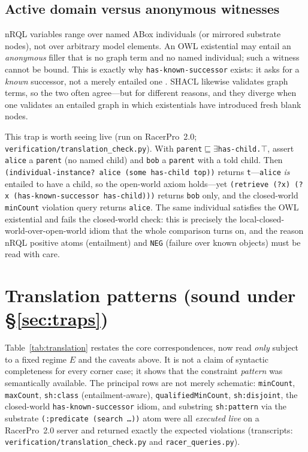 \documentclass[11pt,letterpaper]{article}
\theoremstyle{definition}
\newcommand{\nrql}{nRQL}
\newcommand{\racer}{RacerPro}
\newcommand{\shacl}{SHACL}
\newcommand{\abox}{ABox}
\newcommand{\owl}{OWL}
\begin{document}
\subsection{Active domain versus anonymous witnesses}
\nrql{} variables range over named \abox{} individuals (or mirrored substrate nodes), not over arbitrary model elements. An \owl{} existential may entail an \emph{anonymous} filler that is no graph term and no named individual; such a witness cannot be bound. This is exactly why \texttt{has-known-successor} exists: it asks for a \emph{known} successor, not a merely entailed one \cite[pp.~115--116]{racerug}. \shacl{} likewise validates graph terms, so the two often agree---but for different reasons, and they diverge when one validates an entailed graph in which existentials have introduced fresh blank nodes.

This trap is worth seeing live (run on \racer{}~2.0; \texttt{verification/translation\_check.py}). With \texttt{parent}$\sqsubseteq\exists$\texttt{has-child.}$\top$, assert \texttt{alice} a \texttt{parent} (no named child) and \texttt{bob} a \texttt{parent} with a told child. Then \texttt{(individual-instance? alice (some has-child top))} returns \texttt{t}---\texttt{alice} \emph{is} entailed to have a child, so the open-world axiom holds---yet \texttt{(retrieve (?x) (?x (has-known-successor has-child)))} returns \texttt{bob} only, and the closed-world \texttt{minCount} violation query returns \texttt{alice}. The same individual satisfies the \owl{} existential and fails the closed-world check: this is precisely the local-closed-world-over-open-world idiom that the whole comparison turns on, and the reason \nrql{} positive atoms (entailment) and \texttt{NEG} (failure over known objects) must be read with care.

\section{Translation patterns (sound under \S\ref{sec:traps})}\label{sec:table}

Table~\ref{tab:translation} restates the core correspondences, now read \emph{only} subject to a fixed regime $E$ and the caveats above. It is not a claim of syntactic completeness for every corner case; it shows that the constraint \emph{pattern} was semantically available. The principal rows are not merely schematic: \texttt{minCount}, \texttt{maxCount}, \texttt{sh:class} (entailment-aware), \texttt{qualifiedMinCount}, \texttt{sh:disjoint}, the closed-world \texttt{has-known-successor} idiom, and substring \texttt{sh:pattern} via the substrate \texttt{(:predicate (search \dots))} atom were all \emph{executed live} on a \racer{}~2.0 server and returned exactly the expected violations (transcripts: \texttt{verification/translation\_check.py} and \texttt{racer\_queries.py}).
\end{document}
